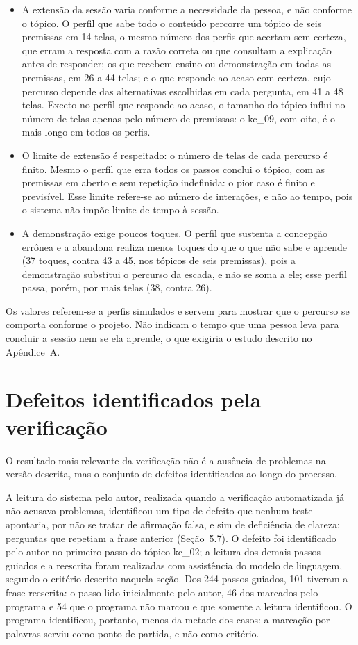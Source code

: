 \begin{itemize}
\item A extensão da sessão varia conforme a necessidade da pessoa, e não conforme o tópico. O perfil que sabe todo o conteúdo percorre um tópico de seis premissas em 14 telas, o mesmo número dos perfis que acertam sem certeza, que erram a resposta com a razão correta ou que consultam a explicação antes de responder; os que recebem ensino ou demonstração em todas as premissas, em 26 a 44 telas; e o que responde ao acaso com certeza, cujo percurso depende das alternativas escolhidas em cada pergunta, em 41 a 48 telas. Exceto no perfil que responde ao acaso, o tamanho do tópico influi no número de telas apenas pelo número de premissas: o kc\_09, com oito, é o mais longo em todos os perfis.
\item O limite de extensão é respeitado: o número de telas de cada percurso é finito. Mesmo o perfil que erra todos os passos conclui o tópico, com as premissas em aberto e sem repetição indefinida: o pior caso é finito e previsível. Esse limite refere-se ao número de interações, e não ao tempo, pois o sistema não impõe limite de tempo à sessão.
\item A demonstração exige poucos toques. O perfil que sustenta a concepção errônea e a abandona realiza menos toques do que o que não sabe e aprende (37 toques, contra 43 a 45, nos tópicos de seis premissas), pois a demonstração substitui o percurso da escada, e não se soma a ele; esse perfil passa, porém, por mais telas (38, contra 26).
\end{itemize}

Os valores referem-se a perfis simulados e servem para mostrar que o percurso se comporta conforme o projeto. Não indicam o tempo que uma pessoa leva para concluir a sessão nem se ela aprende, o que exigiria o estudo descrito no Apêndice~A.

\section{Defeitos identificados pela verificação}

O resultado mais relevante da verificação não é a ausência de problemas na versão descrita, mas o conjunto de defeitos identificados ao longo do processo.

A leitura do sistema pelo autor, realizada quando a verificação automatizada já não acusava problemas, identificou um tipo de defeito que nenhum teste apontaria, por não se tratar de afirmação falsa, e sim de deficiência de clareza: perguntas que repetiam a frase anterior (Seção~5.7). O defeito foi identificado pelo autor no primeiro passo do tópico kc\_02; a leitura dos demais passos guiados e a reescrita foram realizadas com assistência do modelo de linguagem, segundo o critério descrito naquela seção. Dos 244 passos guiados, 101 tiveram a frase reescrita: o passo lido inicialmente pelo autor, 46 dos marcados pelo programa e 54 que o programa não marcou e que somente a leitura identificou. O programa identificou, portanto, menos da metade dos casos: a marcação por palavras serviu como ponto de partida, e não como critério.

